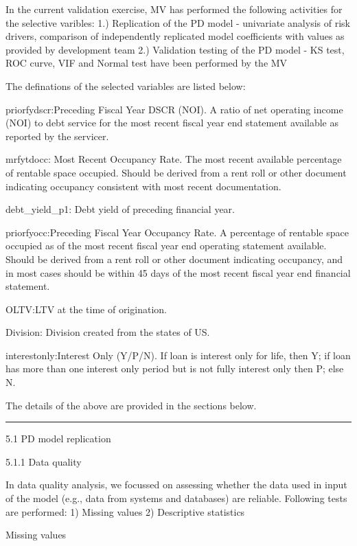 In the current validation exercise, MV has performed the following
activities for the selective varibles: 1.) Replication of the PD model -
univariate analysis of risk drivers, comparison of independently
replicated model coefficients with values as provided by development
team 2.) Validation testing of the PD model - KS test, ROC curve, VIF
and Normal test have been performed by the MV

The definations of the selected variables are listed below:

priorfydscr:Preceding Fiscal Year DSCR (NOI). A ratio of net operating
income (NOI) to debt service for the most recent fiscal year end
statement available as reported by the servicer.

mrfytdocc: Most Recent Occupancy Rate. The most recent available
percentage of rentable space occupied. Should be derived from a rent
roll or other document indicating occupancy consistent with most recent
documentation.

debt\_yield\_p1: Debt yield of preceding financial year.

priorfyocc:Preceding Fiscal Year Occupancy Rate. A percentage of
rentable space occupied as of the most recent fiscal year end operating
statement available. Should be derived from a rent roll or other
document indicating occupancy, and in most cases should be within 45
days of the most recent fiscal year end financial statement.

OLTV:LTV at the time of origination.

Division: Division created from the states of US.

interestonly:Interest Only (Y/P/N). If loan is interest only for life,
then Y; if loan has more than one interest only period but is not fully
interest only then P; else N.

The details of the above are provided in the sections below.

\begin{center}\rule{0.5\linewidth}{\linethickness}\end{center}

5.1 PD model replication

5.1.1 Data quality

In data quality analysis, we focussed on assessing whether the data used
in input of the model (e.g., data from systems and databases) are
reliable. Following tests are performed: 1) Missing values 2)
Descriptive statistics

Missing values

